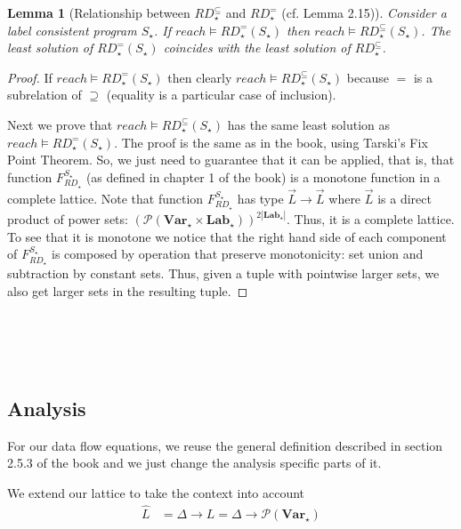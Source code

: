 \documentclass[a4wide,12pt]{article}
\theoremstyle{definition}
\theoremstyle{plain}
\newtheorem{lemma}[theo]{Lemma}
\theoremstyle{remark}
\def\pset#1{\mathcal{P}(#1)}
\def\Lab {\mathbf{Lab}}
\def\Var {\mathbf{Var}}
\begin{document}
\begin{lemma}[Relationship between $RD_\star^\subseteq$ and $RD_\star^=$ (cf. Lemma 2.15)]
Consider a label consistent program $S_\star$.  If $reach \models RD_\star^=(S_\star)$
then $reach \models RD_\star^\subseteq(S_\star)$. The least solution of $RD_\star^=(S_\star)$ coincides
with the least solution of $RD_\star^\subseteq$.
\end{lemma}
\begin{proof}
If $reach \models RD_\star^=(S_\star)$
then clearly $reach \models RD^\subseteq_\star(S_\star)$ because $=$ is a subrelation of $\supseteq$
(equality is a particular case of inclusion).

Next we prove that $reach \models RD_\star^\subseteq(S_\star)$ has the same least solution
as  $reach \models RD_\star^=(S_\star)$.
The proof is the same as in the book, using Tarski's Fix Point Theorem.
So, we just need to guarantee that it can be applied, that is, that 
function $F_{RD_\star}^{S_\star}$ (as defined in chapter 1 of the book) is a monotone
function in a complete lattice.
Note that function $F_{RD_\star}^{S_\star}$
has type $\vec{L} \to \vec{L}$ where $\vec{L}$ is a direct product
of power sets: $(\pset{\Var_\star \times \Lab_\star})^{2|\Lab_\star|}$. Thus, it is a complete lattice. 
To see that it is monotone
we  notice that the right hand side of each component of $F_{RD_\star}^{S_\star}$
is composed by operation that preserve monotonicity: set union and subtraction
by constant sets.
Thus, given a tuple with pointwise
larger sets, we also get larger sets in the resulting tuple.
\end{proof}


\section{~} 

\subsection{Analysis}

For our data flow equations, we reuse the general definition 
described in section 2.5.3 of the book and we just change the analysis specific parts of it.

We extend our lattice to take the context into account
\begin{align*}
\widehat{L} & = \Delta \to L = \Delta \to \pset{\Var_\star}
\end{align*}
\end{document}
